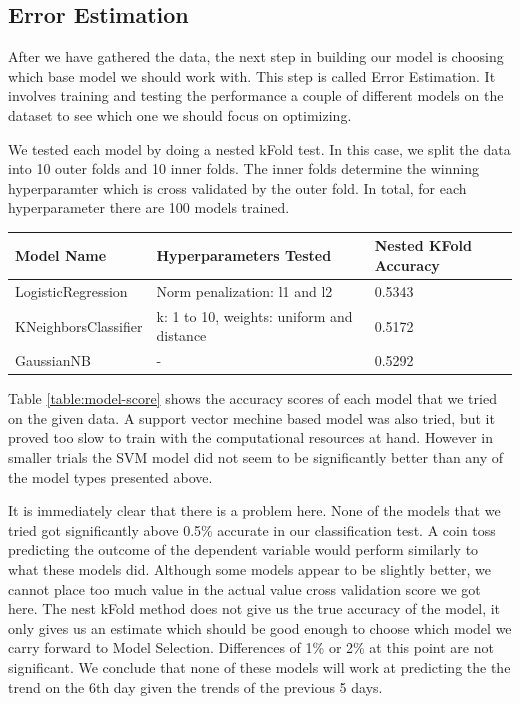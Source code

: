 \documentclass{report}
\begin{document}
\subsection{Error Estimation}

After we have gathered the data, the next step in building our model is choosing which base model we should work with. This step is called Error Estimation. It involves training and testing the performance a couple of different models on the dataset to see which one we should focus on optimizing.

We tested each model by doing a nested kFold test. In this case, we split the data into 10 outer folds and 10 inner folds. The inner folds determine the winning hyperparamter which is cross validated by the outer fold. In total, for each hyperparameter there are 100 models trained.

\begin{center}
  
  \begin{tabular}{l | l | l}
	  Model Name & Hyperparameters Tested & Nested KFold Accuracy \\ \hline
	  LogisticRegression & Norm penalization: l1 and l2 & 0.5343 \\ \hline
	  KNeighborsClassifier & k: 1 to 10, weights: uniform and distance & 0.5172 \\ \hline
	  GaussianNB & - & 0.5292
	  \label{table:model-score}
  \end{tabular}
\end{center}

Table \ref{table:model-score} shows the accuracy scores of each model that we tried on the given data. A support vector mechine based model was also tried, but it proved too slow to train with the computational resources at hand. However in smaller trials the SVM model did not seem to be significantly better than any of the model types presented above.

It is immediately clear that there is a problem here. None of the models that we tried got significantly above 0.5\% accurate in our classification test. A coin toss predicting the outcome of the dependent variable would perform similarly to what these models did. Although some models appear to be slightly better, we cannot place too much value in the actual value cross validation score we got here. The nest kFold method does not give us the true accuracy of the model, it only gives us an estimate which should be good enough to choose which model we carry forward to Model Selection. Differences of 1\% or 2\% at this point are not significant. We conclude that none of these models will work at predicting the the trend on the 6th day given the trends of the previous 5 days.
\end{document}
